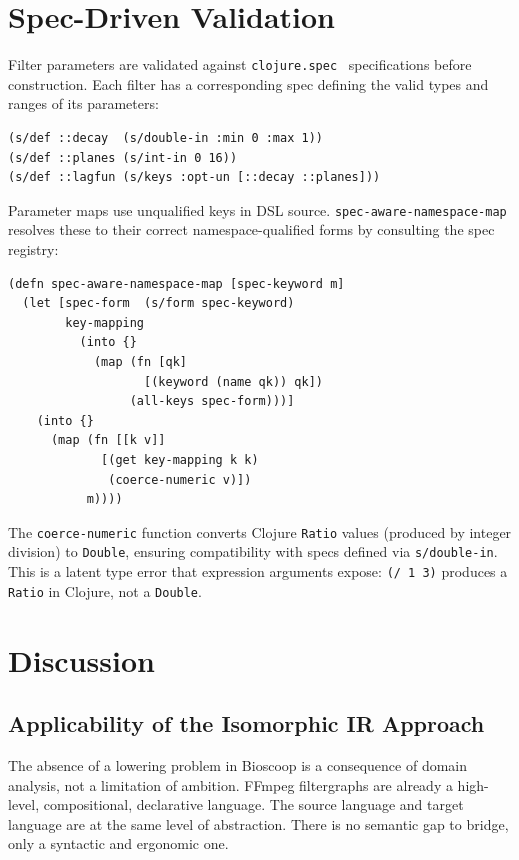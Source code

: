 \documentclass[english,submission]{programming}
\begin{document}
\section{Spec-Driven Validation}

Filter parameters are validated against \texttt{clojure.spec}~\cite{clojurespec} specifications before construction. Each filter has a corresponding spec defining the valid types and ranges of its parameters:

\begin{lstlisting}[caption={Example spec for the lagfun filter}]
(s/def ::decay  (s/double-in :min 0 :max 1))
(s/def ::planes (s/int-in 0 16))
(s/def ::lagfun (s/keys :opt-un [::decay ::planes]))
\end{lstlisting}

Parameter maps use unqualified keys in DSL source. \texttt{spec-aware-namespace-map} resolves these to their correct namespace-qualified forms by consulting the spec registry:

\begin{lstlisting}[caption={Namespace resolution via spec introspection}]
(defn spec-aware-namespace-map [spec-keyword m]
  (let [spec-form  (s/form spec-keyword)
        key-mapping
          (into {}
            (map (fn [qk]
                   [(keyword (name qk)) qk])
                 (all-keys spec-form)))]
    (into {}
      (map (fn [[k v]]
             [(get key-mapping k k)
              (coerce-numeric v)])
           m))))
\end{lstlisting}

The \texttt{coerce-numeric} function converts Clojure \texttt{Ratio} values (produced by integer division) to \texttt{Double}, ensuring compatibility with specs defined via \texttt{s/double-in}. This is a latent type error that expression arguments expose: \texttt{(/ 1 3)} produces a \texttt{Ratio} in Clojure, not a \texttt{Double}.

\section{Discussion}

\subsection{Applicability of the Isomorphic IR Approach}

The absence of a lowering problem in Bioscoop is a consequence of domain analysis, not a limitation of ambition. FFmpeg filtergraphs are already a high-level, compositional, declarative language. The source language and target language are at the same level of abstraction. There is no semantic gap to bridge, only a syntactic and ergonomic one.
\end{document}
